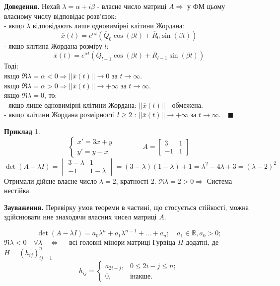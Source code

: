 \documentclass[14pt,a4paper]{scrartcl}
\theoremstyle{definition}
\newtheorem*{example}{Приклад}
\theoremstyle{definition}
\theoremstyle{definition}
\begin{document}
\textbf{Доведення.} Нехай $ \lambda = \alpha + i\beta$ - власне число матриці $A \Rightarrow $ у ФМ цьому власному числу відповідає розв'язок: \\
  - якщо $ \lambda$ відповідають лише одновимірні клітини Жордана:
  $$
  \overline{x} (t) = e^{\alpha t} ( \overline{Q} _0 \cos{(\beta t)} + \overline{R}_0 \sin{(\beta t)} )
 $$
 - якщо клітина Жордана розміру $l$:
 $$
 \overline{x} (t) = e^{\alpha t} ( \overline{Q} _{l-1} \cos{(\beta t)} + \overline{R}_{l-1} \sin{(\beta t)} )
 $$
 Тоді:\\
якщо $ \Re \lambda = \alpha < 0  \Rightarrow || \overline{x} (t)|| \to 0 $ за $t \to \infty$.\\
якщо $ \Re \lambda = \alpha >0 \Rightarrow || \overline{x} (t)|| \to + \infty $ за $t \to \infty$.\\
якщо $ \Re \lambda = 0 $, то:\\
\hspace*{1cm} - якщо лише одновимірні клітини Жордана: $||\overline{x}(t) ||$ - обмежена.\\
\hspace*{1cm} - якщо клітини Жордана розмірності $l \geq 2$ : $ || \overline{x} (t)|| \to + \infty $ за $t \to \infty. \quad \blacksquare$
\begin{example}
    $$\begin{cases}
        x' = 3x + y \\
        y' = y-x
    \end{cases} \qquad \qquad A = \begin{bmatrix}
     3 & 1 \\ -1 & 1
    \end{bmatrix}
    $$
    $$
    \det \left( A - \lambda I  \right) = \begin{vmatrix}
      3 - \lambda & 1 \\
      -1 & 1- \lambda
    \end{vmatrix}  = (3 - \lambda) (1- \lambda) + 1 = \lambda^2 - 4 \lambda + 3 = (\lambda-2 )^2
    $$
    Отримали дійсне власне число $\lambda=2$, кратності 2. $ \Re \lambda = 2 > 0 \Rightarrow $ Система нестійка.
\end{example}
\textbf{Зауваження.} Перевірку умов теореми в частині, що стосується стійкості, можна здійснювати нне знаходячи власних чисел матриці $A$.

\begin{spacing}{1.25}
  \begin{boxteo}
  $$
  \det \left( A - \lambda I \right) = a_0 \lambda^n + a_1 \lambda^{n-1} + ... + a_n ; \quad a_1 \in \mathbb{R}, a_0 > 0;
  $$
  $
  \Re \lambda < 0 \quad \forall \lambda \quad \Longleftrightarrow \quad
  $ всі головні мінори матриці Гурвіца $H$ додатні, де $ H =  \left( h_{ij} \right)^n_{ij=1} $
  $$
  h_{ij} = \begin{cases}
      a_{2i-j}, & 0 \leq 2i - j \leq  n;\\
      0 , & \text{інакше.}
  \end{cases}
  $$
  \end{boxteo}
\end{spacing}


\end{document}
